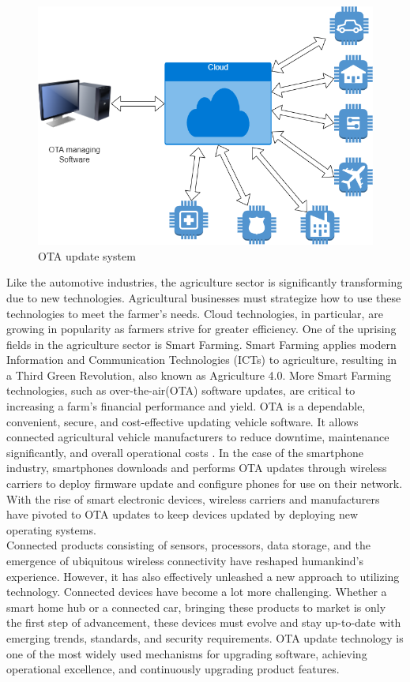 \documentclass[12pt,a4paper]{article}
\begin{document}
\begin{figure}[H]
\centering
\includegraphics[scale=0.5]{ota.png}
\caption{OTA update system}
\label{ota}
\end{figure}

Like the automotive industries, the agriculture sector is significantly transforming due to new technologies. Agricultural businesses must strategize how to use these technologies to meet the farmer's needs. Cloud technologies, in particular, are growing in popularity as farmers strive for greater efficiency. One of the uprising fields in the agriculture sector is Smart Farming. Smart Farming applies modern Information and Communication Technologies (ICTs) to agriculture, resulting in a Third Green Revolution, also known as Agriculture 4.0. More Smart Farming technologies, such as over-the-air(OTA) software updates, are critical to increasing a farm's financial performance and yield. OTA is a dependable, convenient, secure, and cost-effective updating vehicle software. It allows connected agricultural vehicle manufacturers to reduce downtime, maintenance significantly, and overall operational costs \cite{r7} \cite{r8}. In the case of the smartphone industry, smartphones downloads and performs OTA updates through wireless carriers to deploy firmware update and configure phones for use on their network. With the rise of smart electronic devices, wireless carriers and manufacturers have pivoted to OTA updates to keep devices updated by deploying new operating systems. \cite{r9} \\

Connected products consisting of sensors, processors, data storage, and the emergence of ubiquitous wireless connectivity have reshaped humankind's experience. However, it has also effectively unleashed a new approach to utilizing technology. Connected devices have become a lot more challenging. Whether a smart home hub or a connected car, bringing these products to market is only the first step of advancement, these devices must evolve and stay up-to-date with emerging trends, standards, and security requirements. OTA update technology is one of the most widely used mechanisms for upgrading software, achieving operational excellence, and continuously upgrading product features. \cite{r10} \\
\end{document}
